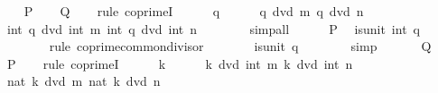 \begin{isabellebody}
%
\isadelimproof
%
\endisadelimproof
%
\isatagproof
{}\isamarkupfalse%
\isanewline
\ \ \isamarkupfalse%
\ {\isacharquery}{\kern0pt}P\isanewline
\ \ \isamarkupfalse%
\ {\isacharquery}{\kern0pt}Q\isanewline
\ \ \isamarkupfalse%
\ {\isacharparenleft}{\kern0pt}rule\ coprimeI{\isacharparenright}{\kern0pt}\isanewline
\ \ \ \ \isamarkupfalse%
\ q\isanewline
\ \ \ \ \isamarkupfalse%
\ {\isachardoublequoteopen}q\ dvd\ m{\isachardoublequoteclose}\ {\isachardoublequoteopen}q\ dvd\ n{\isachardoublequoteclose}\isanewline
\ \ \ \ \isamarkupfalse%
\ \isamarkupfalse%
\ {\isachardoublequoteopen}int\ q\ dvd\ int\ m{\isachardoublequoteclose}\ {\isachardoublequoteopen}int\ q\ dvd\ int\ n{\isachardoublequoteclose}\isanewline
\ \ \ \ \ \ \isamarkupfalse%
\ simp{\isacharunderscore}{\kern0pt}all\isanewline
\ \ \ \ \isamarkupfalse%
\ {\isacartoucheopen}{\isacharquery}{\kern0pt}P{\isacartoucheclose}\ \isamarkupfalse%
\ {\isachardoublequoteopen}is{\isacharunderscore}{\kern0pt}unit\ {\isacharparenleft}{\kern0pt}int\ q{\isacharparenright}{\kern0pt}{\isachardoublequoteclose}\isanewline
\ \ \ \ \ \ \isamarkupfalse%
\ {\isacharparenleft}{\kern0pt}rule\ coprime{\isacharunderscore}{\kern0pt}common{\isacharunderscore}{\kern0pt}divisor{\isacharparenright}{\kern0pt}\isanewline
\ \ \ \ \isamarkupfalse%
\ \isamarkupfalse%
\ {\isachardoublequoteopen}is{\isacharunderscore}{\kern0pt}unit\ q{\isachardoublequoteclose}\isanewline
\ \ \ \ \ \ \isamarkupfalse%
\ simp\isanewline
\ \ \isamarkupfalse%
\isanewline
{}\isamarkupfalse%
\isanewline
\ \ \isamarkupfalse%
\ {\isacharquery}{\kern0pt}Q\isanewline
\ \ \isamarkupfalse%
\ {\isacharquery}{\kern0pt}P\isanewline
\ \ \isamarkupfalse%
\ {\isacharparenleft}{\kern0pt}rule\ coprimeI{\isacharparenright}{\kern0pt}\isanewline
\ \ \ \ \isamarkupfalse%
\ k\isanewline
\ \ \ \ \isamarkupfalse%
\ {\isachardoublequoteopen}k\ dvd\ int\ m{\isachardoublequoteclose}\ {\isachardoublequoteopen}k\ dvd\ int\ n{\isachardoublequoteclose}\isanewline
\ \ \ \ \isamarkupfalse%
\ \isamarkupfalse%
\ {\isachardoublequoteopen}nat\ {\isasymbar}k{\isasymbar}\ dvd\ m{\isachardoublequoteclose}\ {\isachardoublequoteopen}nat\ {\isasymbar}k{\isasymbar}\ dvd\ n{\isachardoublequoteclose}\isanewline

\end{isabellebody}
